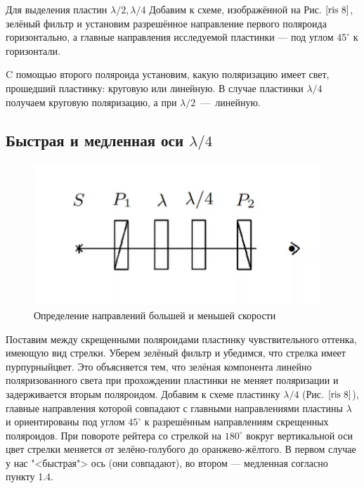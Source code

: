 \documentclass[a4paper, 12pt]{article}
\begin{document}
Для выделения пластин $ \lambda/2, \lambda/4 $ Добавим к схеме, изображённой на Рис. $\ref{ris 8}$, зелёный фильтр и установим разрешённое направление первого поляроида горизонтально, а главные направления исследуемой пластинки --- под углом $ 45^\circ $ к горизонтали.

C помощью второго поляроида установим, какую поляризацию имеет свет, прошедший пластинку: круговую или линейную. В случае пластинки $ \lambda/4 $ получаем круговую поляризацию, а при $ \lambda/2 $~---~линейную.

\newpage

\subsection{Быстрая и медленная оси $ \lambda/4 $}

\begin{figure}
	\includegraphics[width=\linewidth]{8}
	\caption{Определение направлений
большей и меньшей скорости}
	\label{ris 8}
\end{figure}

Поставим между скрещенными поляроидами пластинку чувствительного оттенка, имеющую вид стрелки. Уберем зелёный фильтр и убедимся, что стрелка имеет пурпурныйцвет. Это объясняется тем, что зелёная компонента линейно поляризованного света при прохождении пластинки не меняет поляризации и задерживается вторым поляроидом. 
Добавим к схеме пластинку $ \lambda/4 $ (Рис. $\ref{ris 8}$), главные направления которой совпадают с главными направлениями пластины $ \lambda $ и ориентированы под углом $ 45^\circ $ к разрешённым направлениям скрещенных поляроидов. При повороте рейтера со стрелкой на $ 180^\circ $ вокруг вертикальной оси цвет стрелки меняется от зелёно-голубого до оранжево-жёлтого. В первом случае у нас "<быстрая"> ось (они совпадают), во втором --- медленная согласно пункту 1.4.
\end{document}

